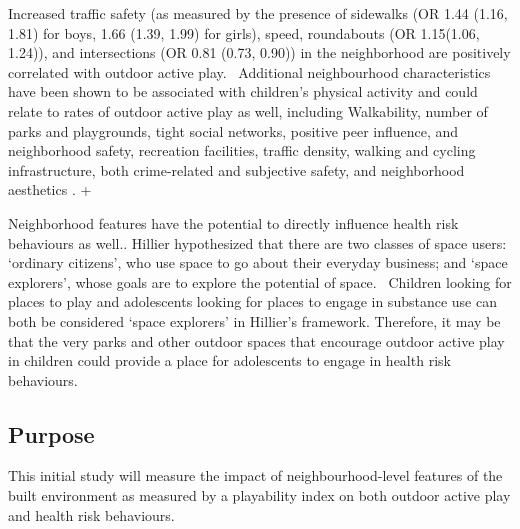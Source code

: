 \documentclass [11pt]{article}
\begin{document}
Increased traffic safety (as measured by the presence of sidewalks (OR 1.44 (1.16, 1.81) for boys, 1.66 (1.39, 1.99) for girls), speed, roundabouts (OR 1.15(1.06, 1.24)), and intersections (OR 0.81 (0.73, 0.90)) in the neighborhood are positively correlated with outdoor active play.~\cite{Aarts2010-pk,Aarts2012-dt} Additional neighbourhood characteristics have been shown to be associated with children's physical activity and could relate to rates of outdoor active play as well, including Walkability, number of parks and playgrounds, tight social networks, positive peer influence, and neighborhood safety, recreation facilities, traffic density, walking and cycling infrastructure, both crime-related and subjective safety, and neighborhood aesthetics \cite{Timperio2015-wn}. +

Neighborhood features have the potential to directly influence health risk behaviours as well.. Hillier hypothesized that there are two classes of space users: `ordinary citizens', who use space to go about their everyday business; and `space explorers', whose goals are to explore the potential of space.~\cite{Wallace2017-kj,Spilkova2014-iv,noauthor_undated-pd} Children looking for places to play and adolescents looking for places to engage in substance use can both be considered `space explorers' in Hillier's framework. Therefore, it may be that the very parks and other outdoor spaces that encourage outdoor active play in children could provide a place for adolescents to engage in health risk behaviours. 

\subsection{Purpose}

This initial study will measure the impact of neighbourhood-level features of the built environment as measured by a playability index on both outdoor active play and health risk behaviours. 
\end{document}
